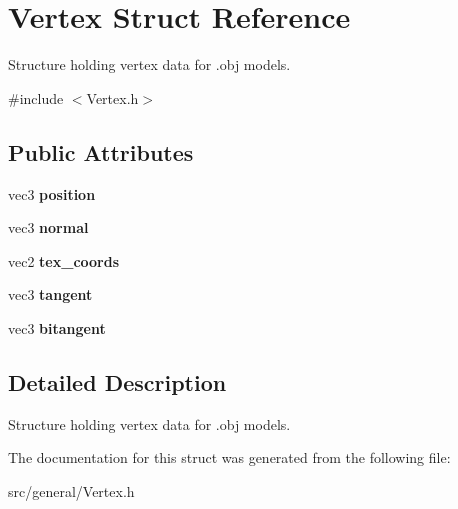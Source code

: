 \hypertarget{struct_vertex}{}\section{Vertex Struct Reference}
\label{struct_vertex}


Structure holding vertex data for .obj models.  




{\ttfamily \#include $<$Vertex.\+h$>$}

\subsection*{Public Attributes}
\begin{DoxyCompactItemize}
\item 
\mbox{\label{struct_vertex_acfaea5e84903616d2c7ce81f6c0c25bc}} 
vec3 {\bfseries position}
\item 
\mbox{\label{struct_vertex_ae02d1c228b7ffcfb1c5eeec3973fe802}} 
vec3 {\bfseries normal}
\item 
\mbox{\label{struct_vertex_a3d5e99fd8e3bcfa6a14ce1d7cb12e4ad}} 
vec2 {\bfseries tex\+\_\+coords}
\item 
\mbox{\label{struct_vertex_af7302deb307ba8987c47f47a92bf1d1e}} 
vec3 {\bfseries tangent}
\item 
\mbox{\label{struct_vertex_a3a174cc54d976270608b66ca3e4b0e02}} 
vec3 {\bfseries bitangent}
\end{DoxyCompactItemize}


\subsection{Detailed Description}
Structure holding vertex data for .obj models. 

The documentation for this struct was generated from the following file\+:\begin{DoxyCompactItemize}
\item 
src/general/Vertex.\+h\end{DoxyCompactItemize}

